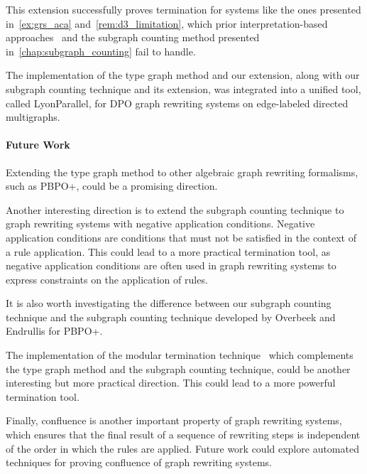 \documentclass{report}
\begin{document}
This extension successfully proves termination for systems like the ones presented 
in~\autoref{ex:grs_aca} and~\autoref{rem:d3_limitation}, which prior interpretation-based approaches~\cite{zantema2014termination,bruggink2014termination,bruggink2015proving,endrullis2024generalized_arxiv_v2,overbeek2024termination_lmcs} and the subgraph counting method presented in~\autoref{chap:subgraph_counting} fail to handle. 

The implementation of the type graph method and our extension, along with our subgraph counting technique and its extension, was integrated into a unified tool, called LyonParallel, for DPO graph rewriting systems on edge-labeled directed multigraphs.
 
\paragraph{Future Work}

Extending the type graph method to other algebraic graph rewriting formalisms, such as PBPO+, could be a promising direction.

Another interesting direction is to extend the subgraph counting technique to graph rewriting systems with negative application conditions. Negative application conditions are conditions that must not be satisfied in the context of a rule application. This could lead to a more practical termination tool, as negative application conditions are often used in graph rewriting systems to express constraints on the application of rules.

It is also worth investigating the difference between our subgraph counting technique and
 the subgraph counting technique developed by Overbeek and Endrullis for PBPO+. 
 
The implementation of the modular termination technique~\cite{plump2018modular} which complements the type graph method and the subgraph counting technique, could be another interesting but more practical direction. This could lead to a more powerful termination tool.
  
Finally, confluence is another important property of graph rewriting systems, which ensures that the final result of a sequence of rewriting steps is independent of the order in which the rules are applied. Future work could explore automated techniques for proving confluence of graph rewriting systems.
\end{document}
